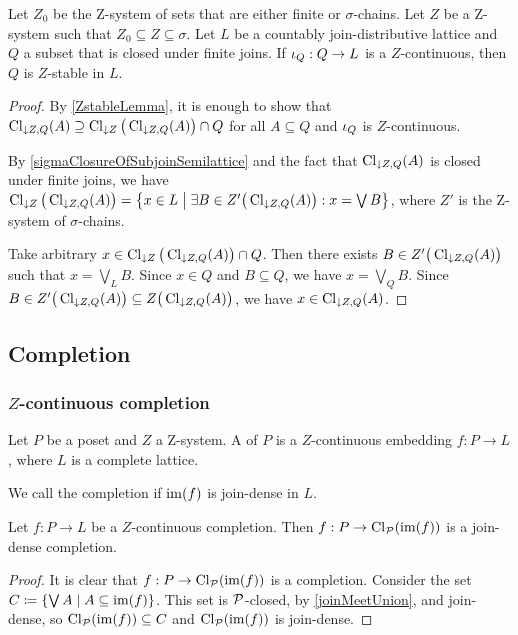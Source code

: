 \begin{proposition}
Let $Z_0$ be the $\mathrm{Z}$-system of sets that are either finite or $\sigma$-chains. Let $Z$ be a $\mathrm{Z}$-system such that $Z_0 \subseteq Z \subseteq \sigma$. Let $L$ be a countably join-distributive lattice and $Q$ a subset that is closed under finite joins. If $\operatorname{\iota}_Q: Q\to L$ is a $Z$-continuous, then $Q$ is $Z$-stable in $L$.
\end{proposition}
\begin{proof}
By \ref{ZstableLemma}, it is enough to show that $\operatorname{Cl}_{\downarrow Z, Q}(A) \supseteq \operatorname{Cl}_{\downarrow Z}\big(\operatorname{Cl}_{\downarrow Z, Q}(A)\big) \cap Q$ for all $A\subseteq Q$ and $\operatorname{\iota}_Q$ is $Z$-continuous.

By \ref{sigmaClosureOfSubjoinSemilattice} and the fact that $\operatorname{Cl}_{\downarrow Z, Q}(A)$ is closed under finite joins, we have $\Closure_{\downarrow Z}\big(\Closure_{\downarrow Z, Q}(A)\big) = \setbuilder{x\in L}{\exists B\in Z'\big(\Closure_{\downarrow Z, Q}(A)\big): x = \bigvee B}$, where $Z'$ is the $\mathrm{Z}$-system of $\sigma$-chains.

Take arbitrary $x\in \operatorname{Cl}_{\downarrow Z}\big(\operatorname{Cl}_{\downarrow Z, Q}(A)\big) \cap Q$. Then there exists $B\in Z'\big(\operatorname{Cl}_{\downarrow Z, Q}(A)\big)$ such that $x = \bigvee_L B$. Since $x\in Q$ and $B\subseteq Q$, we have $x = \bigvee_{Q} B$. Since $B\in Z'\big(\operatorname{Cl}_{\downarrow Z, Q}(A)\big) \subseteq Z\big(\operatorname{Cl}_{\downarrow Z, Q}(A)\big)$, we have $x\in \operatorname{Cl}_{\downarrow Z, Q}(A)$.
\end{proof}

\subsection{Completion}
\subsubsection{$Z$-continuous completion}
\begin{definition}
Let $P$ be a poset and $Z$ a $\mathrm{Z}$-system. A  of $P$ is a $Z$-continuous embedding $f: P \to L$, where $L$ is a complete lattice.

We call the completion  if $\operatorname{im}(f)$ is join-dense in $L$.
\end{definition}

\begin{lemma} \label{closureGivesJoinDenseCompletion}
Let $f: P \to L$ be a $Z$-continuous completion. Then $f: P\to \operatorname{Cl}_{\operatorname{\mathcal{P}}}(\operatorname{im}(f))$ is a join-dense completion.
\end{lemma}
\begin{proof}
It is clear that $f: P\to \operatorname{Cl}_{\operatorname{\mathcal{P}}}(\operatorname{im}(f))$ is a completion. Consider the set $C \defeq \setbuilder{\bigvee A}{A\subseteq \im(f)}$. This set is $\operatorname{\mathcal{P}}$-closed, by \ref{joinMeetUnion}, and join-dense, so $\operatorname{Cl}_{\operatorname{\mathcal{P}}}(\operatorname{im}(f)) \subseteq C$ and $\operatorname{Cl}_{\operatorname{\mathcal{P}}}(\operatorname{im}(f))$ is join-dense.
\end{proof}

